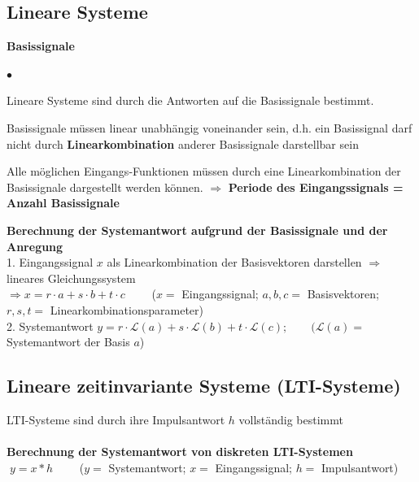 	\subsection{Lineare Systeme}
		\textbf{Basissignale}
		\begin{list}{$\bullet$}{\setlength{\itemsep}{0cm} \setlength{\parsep}{0cm} \setlength{\topsep}{0cm}} 
          \item Lineare Systeme sind durch die Antworten auf die
          Basissignale bestimmt.
          \item Basissignale müssen linear unabhängig voneinander sein, d.h. ein
		Basissignal darf nicht durch \textbf{Linearkombination} anderer Basissignale
		darstellbar sein          
		  \item Alle möglichen Eingangs-Funktionen müssen durch eine Linearkombination der
		Basissignale dargestellt werden können. $\Rightarrow$ \textbf{Periode des Eingangssignals =	Anzahl Basissignale}
        \end{list}
        \vspace{.2cm}
		\textbf{Berechnung der Systemantwort aufgrund der Basissignale und der
		Anregung}\\
		1. Eingangssignal $x$ als Linearkombination der Basisvektoren darstellen
		$\Rightarrow$ lineares Gleichungssystem\\
		\qquad $\Rightarrow x=r\cdot a + s\cdot b + t\cdot c\qquad$ ($x=$
		Eingangssignal; $a,b,c=$ Basisvektoren; $r,s,t=$
		Linearkombinationsparameter)\\ 
		2. Systemantwort $y=r\cdot \mathcal{L}(a) + s\cdot \mathcal{L}(b) + t\cdot \mathcal{L}(c); \qquad (\mathcal{L}(a)=$
		Systemantwort der Basis $a$)
	
	\subsection{Lineare zeitinvariante Systeme (LTI-Systeme) }
		LTI-Systeme sind durch ihre Impulsantwort $h$ vollständig bestimmt\\ \\	
		\textbf{Berechnung der Systemantwort von diskreten LTI-Systemen}\\
		$\; y=x*h \qquad$ ($y=$ Systemantwort; $x=$ Eingangssignal; $h=$
		Impulsantwort)\\
		
